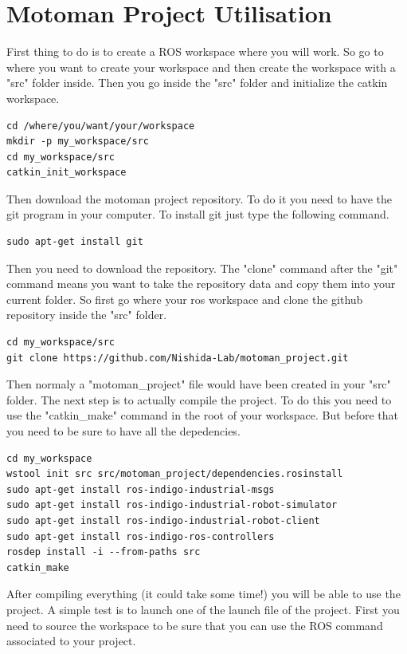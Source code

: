 \section{Motoman Project Utilisation}
First thing to do is to create a ROS workspace where you will work.  So go to where you want to create your workspace and then create the workspace with a "src" folder inside. Then you go inside the "src" folder and initialize the catkin workspace.

\begin{lstlisting}
cd /where/you/want/your/workspace
mkdir -p my_workspace/src
cd my_workspace/src
catkin_init_workspace
\end{lstlisting}

Then download the motoman project repository. To do it you need to have the git program in your computer. To install git just type the following command.

\begin{lstlisting}
sudo apt-get install git
\end{lstlisting}

Then you need to download the repository. The "clone" command after the "git" command means you want to take the repository data and copy them into your current folder. So first go where your ros workspace and clone the github repository inside the "src" folder.  

\begin{lstlisting}
cd my_workspace/src
git clone https://github.com/Nishida-Lab/motoman_project.git
\end{lstlisting}

Then normaly a "motoman\_project" file would have been created in your "src" folder. The next step is to actually compile the project. To do this you need to use the "catkin\_make" command in the root of your workspace. But before that you need to be sure to have all the depedencies. 


\begin{lstlisting}
cd my_workspace
wstool init src src/motoman_project/dependencies.rosinstall
sudo apt-get install ros-indigo-industrial-msgs
sudo apt-get install ros-indigo-industrial-robot-simulator
sudo apt-get install ros-indigo-industrial-robot-client
sudo apt-get install ros-indigo-ros-controllers
rosdep install -i --from-paths src
catkin_make
\end{lstlisting}

After compiling everything (it could take some time!) you will be able to use the project. A simple test is to launch one of the launch file of the project. First you need to source the workspace to be sure that you can use the ROS command associated to your project.

